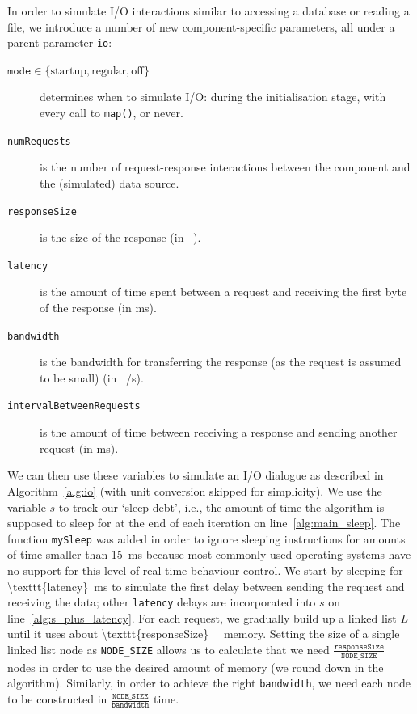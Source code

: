 \documentclass{article}
\begin{document}
In order to simulate I/O interactions similar to accessing a database or reading
a file, we introduce a number of new component-specific parameters, all under a
parent parameter \texttt{io}:
\begin{description}
\item[$\texttt{mode} \in \{ \text{startup}, \text{regular}, \text{off} \}$]
  determines when to simulate I/O: during the initialisation stage, with every
  call to \texttt{map()}, or never.
\item[\texttt{numRequests}] is the number of request-response interactions
  between the component and the (simulated) data source.
\item[\texttt{responseSize}] is the size of the response (in \si{\kibi\byte}).
\item[\texttt{latency}] is the amount of time spent between a request
  and receiving the first byte of the response (in \si{\milli\second}).
\item[\texttt{bandwidth}] is the bandwidth for transferring the response (as the
  request is assumed to be small) (in
  \si[per-mode=symbol]{\mebi\bit\per\second}).
\item[\texttt{intervalBetweenRequests}] is the amount of time between receiving
  a response and sending another request (in \si{\milli\second}).
\end{description}

We can then use these variables to simulate an I/O dialogue as described in
Algorithm~\ref{alg:io} (with unit conversion skipped for
simplicity). We use the variable $s$ to track our `sleep debt', i.e., the amount
of time the algorithm is supposed to sleep for at the end of each iteration on
line~\ref{alg:main_sleep}. The function \texttt{mySleep} was added in order to
ignore sleeping instructions for amounts of time smaller than
\SI{15}{\milli\second} because most commonly-used operating systems have no
support for this level of real-time behaviour control. We start by sleeping for
\SI[number-math-rm=\mathnormal,parse-numbers=false]{\texttt{latency}}{\milli\second}
to simulate the first delay between sending the request and receiving the data;
other \texttt{latency} delays are incorporated into $s$ on
line~\ref{alg:s_plus_latency}. For each request, we gradually build up a linked
list $L$ until it uses about
\SI[number-math-rm=\mathnormal,parse-numbers=false]{\texttt{responseSize}}{\kibi\byte}
memory. Setting the size of a single linked list node as \texttt{NODE\_SIZE}
allows us to calculate that we need
$\frac{\texttt{responseSize}}{\texttt{NODE\_SIZE}}$ nodes in order to use the
desired amount of memory (we round down in the algorithm). Similarly, in order
to achieve the right \texttt{bandwidth}, we need each node to be constructed in
$\frac{\texttt{NODE\_SIZE}}{\texttt{bandwidth}}$ time.
\end{document}
